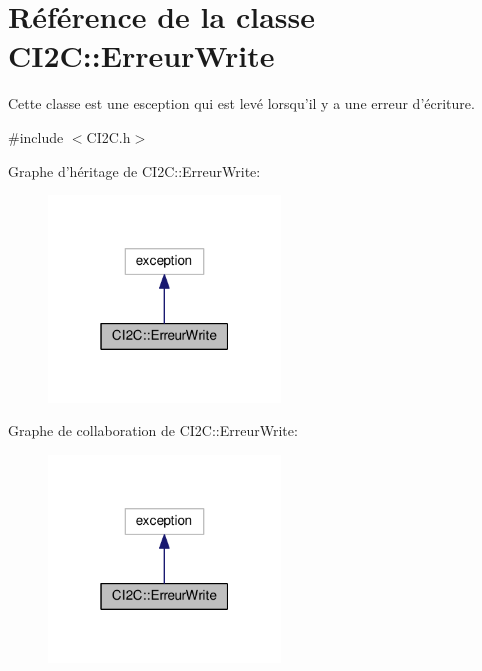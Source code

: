 \hypertarget{class_c_i2_c_1_1_erreur_write}{\section{Référence de la classe C\+I2\+C\+:\+:Erreur\+Write}
\label{class_c_i2_c_1_1_erreur_write}
}


Cette classe est une esception qui est levé lorsqu'il y a une erreur d'écriture.  




{\ttfamily \#include $<$C\+I2\+C.\+h$>$}



Graphe d'héritage de C\+I2\+C\+:\+:Erreur\+Write\+:
\nopagebreak
\begin{figure}[H]
\begin{center}
\leavevmode
\includegraphics[width=175pt]{class_c_i2_c_1_1_erreur_write__inherit__graph}
\end{center}
\end{figure}


Graphe de collaboration de C\+I2\+C\+:\+:Erreur\+Write\+:
\nopagebreak
\begin{figure}[H]
\begin{center}
\leavevmode
\includegraphics[width=175pt]{class_c_i2_c_1_1_erreur_write__coll__graph}
\end{center}
\end{figure}
